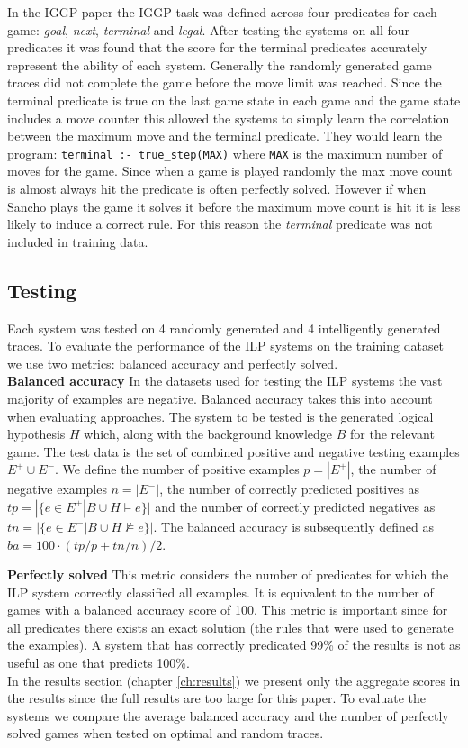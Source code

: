 In the IGGP paper \cite{Cropper/IGGP} the IGGP task was defined across four predicates for each game: \textit{goal}, \textit{next}, \textit{terminal} and \textit{legal}. After testing the systems on all four predicates it was found that the score for the terminal predicates accurately represent the ability of each system. Generally the randomly generated game traces did not complete the game before the move limit was reached. Since the terminal predicate is true on the last game state in each game and the game state includes a move counter this allowed the systems to simply learn the correlation between the maximum move and the terminal predicate. They would learn the program: \verb|terminal :- true_step(MAX)| where \verb|MAX| is the maximum number of moves for the game. Since when a game is played randomly the max move count is almost always hit the predicate is often perfectly solved. However if when Sancho plays the game it solves it before the maximum move count is hit it is less likely to induce a correct rule. For this reason the \textit{terminal} predicate was not included in training data.

\subsection{Testing}

Each system was tested on 4 randomly generated and 4 intelligently generated traces. To evaluate the performance of the ILP systems on the training dataset we use two metrics: balanced accuracy and perfectly solved.
\\

\textbf{Balanced accuracy} In the datasets used for testing the ILP systems the vast majority of examples are negative. Balanced accuracy takes this into account when evaluating approaches. The system to be tested is the generated logical hypothesis $H$ which, along with the background knowledge $B$ for the relevant game. The test data is the set of combined positive and negative testing examples $E^+ \cup E^-$. We define the number of positive examples $p = |E^+|$, the number of negative examples $n = |E^-|$, the number of correctly predicted positives as $tp = |\{e\in E^+|B\cup H \models e\}|$ and the number of correctly predicted negatives as $tn = |\{e\in E^-|B\cup H \not\models e\}|$. The balanced accuracy is subsequently defined as $ba = 100 \cdot (tp/p + tn/n)/2$.

\textbf{Perfectly solved} This metric considers the number of predicates for which the ILP system correctly classified all examples. It is equivalent to the number of games with a balanced accuracy score of 100. This metric is important since for all predicates there exists an exact solution (the rules that were used to generate the examples). A system that has correctly predicated 99\% of the results is not as useful as one that predicts 100\%.
\\

In the results section (chapter \ref{ch:results}) we present only the aggregate scores in the results since the full results are too large for this paper. To evaluate the systems we compare the average balanced accuracy and the number of perfectly solved games when tested on optimal and random traces.



